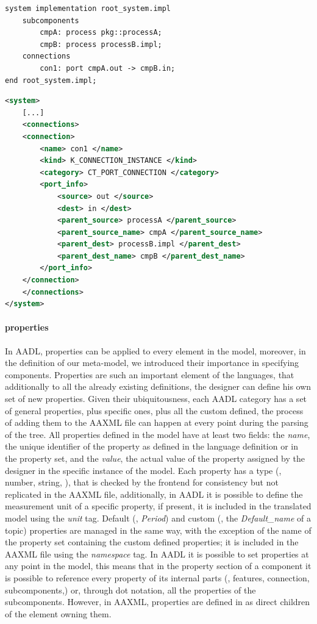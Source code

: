 \begin{lstlisting}[language=AADL,caption={Minimal AADL model containing connections.},label=lst:con-aadl]
system implementation root_system.impl
	subcomponents
		cmpA: process pkg::processA;
		cmpB: process processB.impl;
	connections
		con1: port cmpA.out -> cmpB.in;
end root_system.impl;
\end{lstlisting}

\begin{lstlisting}[language=XML,caption={AAXML description of AADL connections},label=lst:con-aaxml]
<system>
	[...]
	<connections>
	<connection>
		<name> con1 </name>
		<kind> K_CONNECTION_INSTANCE </kind>
		<category> CT_PORT_CONNECTION </category>
		<port_info>
			<source> out </source>
			<dest> in </dest>
			<parent_source> processA </parent_source>
			<parent_source_name> cmpA </parent_source_name>
			<parent_dest> processB.impl </parent_dest>
			<parent_dest_name> cmpB </parent_dest_name>
		</port_info>
	</connection>
	</connections>
</system>
\end{lstlisting}

\paragraph{properties} In AADL, properties can be applied to every element in the model, moreover, in the definition of our meta-model, we introduced their importance in specifying components. Properties are such an important element of the languages, that additionally to all the already existing definitions, the designer can define his own set of new properties. Given their ubiquitousness, each AADL category has a set of general properties, plus specific ones, plus all the custom defined, the process of adding them to the AAXML file can happen at every point during the parsing of the tree. All properties defined in the model have at least two fields: the \textit{name}, the unique identifier of the property as defined in the language definition or in the property set, and the \textit{value}, the actual value of the property assigned by the designer in the specific instance of the model. Each property has a type (\eg, number, string, \etc), that is checked by the frontend for consistency but not replicated in the AAXML file, additionally, in AADL it is possible to define the measurement unit of a specific property, if present, it is included in the translated model using the \textit{unit} tag. Default (\eg, \textit{Period}) and custom (\eg, the \textit{Default\_name} of a topic) properties are managed in the same way, with the exception of the name of the property set containing the custom defined properties; it is included in the AAXML file using the \textit{namespace} tag. In AADL it is possible to set properties at any point in the model, this means that in the property section of a component it is possible to reference every property of its internal parts (\eg, features, connection, subcomponents,\etc) or, through dot notation, all the properties of the subcomponents. However, in AAXML, properties are defined in as direct children of the element owning them.


